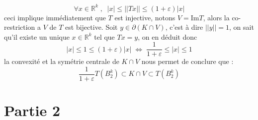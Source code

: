 \documentclass{report}
\begin{document}
\begin{enumerate}[leftmargin=\labelsep]
	\begin{equation*}
	\forall x \in \mathbb{R}^k \; , \;\; |x|\leq ||Tx||\leq (1+\varepsilon)|x|
	\end{equation*}
	ceci implique immédiatement que $T$ est injective, notons $V=\text{Im}T$, alors la co-restriction a $V$ de $T$ est bijective.
	Soit $y\in \partial(K\cap V)$, c'est à dire $||y||=1$, on sait qu'il existe un unique $x\in\mathbb{R}^k$ tel que $Tx=y$, on en déduit donc 
	\begin{equation*}
	|x|\leq 1 \leq (1+\varepsilon)|x|\; \iff\; \frac{1}{1+\varepsilon}\leq|x|\leq 1
	\end{equation*}
	la convexité et la symétrie centrale de $K\cap V$ nous permet de conclure que  :
	\begin{equation*}
		\frac{1}{1+\varepsilon}T(B_2^k)\subset K\cap V \subset T(B_2^k)
	\end{equation*}
\end{enumerate}
\newpage
\chapter*{Partie 2}
\end{document}
